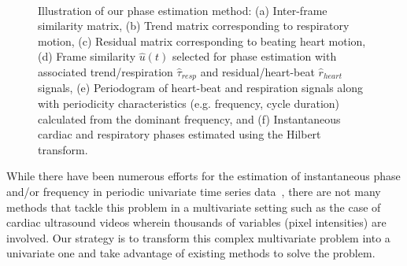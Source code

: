 \documentclass[journal]{IEEEtran}
\newcounter{lfigcounter}
\def\ionbox#1{\makebox[#1]{(\alph{lfigcounter})}\stepcounter{lfigcounter}}
\begin{document}
\begin{figure}[!t]
\ionbox{6.0in}\\
%
\caption{Illustration of our phase estimation method: (a) Inter-frame similarity matrix, (b) Trend matrix corresponding to respiratory motion, (c) Residual matrix corresponding to beating heart motion, (d) Frame similarity $\hat{u}(t)$ selected for phase estimation with associated trend/respiration $\hat{\tau}_{resp}$ and residual/heart-beat $\hat{r}_{heart}$ signals, (e) Periodogram of heart-beat and respiration signals along with periodicity characteristics (e.g. frequency, cycle duration) calculated from the dominant frequency, and (f) Instantaneous cardiac and respiratory phases estimated using the Hilbert transform.}
\label{fig:phase_estimation}
\end{figure}
%

While there have been numerous efforts for the estimation of instantaneous phase and/or frequency in periodic univariate time series data~\cite{Boashash1992,Rosenblum2001,Freund2003,Luo2003,Lu2013}, there are not many methods that tackle this problem in a multivariate setting such as the case of cardiac ultrasound videos wherein thousands of variables (pixel intensities) are involved. Our strategy is to transform this complex multivariate problem into a univariate one and take advantage of existing methods to solve the problem. 
%
\end{document}
